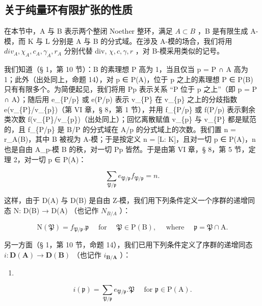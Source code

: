\subsection{关于纯量环有限扩张的性质}

在本节中，A 与 B 表示两个整闭 Noether 整环，满足 \(A \subset B\) ，B 是有限生成 A-模，而 K 与 L 分别是 A 与 B 的分式域。在涉及 A-模的场合，我们将用 \(div_{A}, \chi_{A}, c_{A}, \gamma_{A}, r_{A}\) 分别代替 div, \(\chi, c, \gamma, r\) ，对 B-模采用类似的记号。

我们知道（§ 1，第 10 节）：B 的素理想 P 高为 1，当且仅当 p = P ∩ A 高为 1；此外（出处同上，命题 14），对 p ∈ P(A)，位于 p 之上的素理想 P ∈ P(B) 只有有限多个。为简便起见，我们将用 P\textbar p 表示关系 ``P 位于 p 之上''（即 p = P ∩ A）；随后用 e\_\{P/p\} 或 e(P/p) 表示 v\_\{P\} 在 v\_\{p\} 之上的分歧指数 e(v\_\{P\}/v\_\{p\})（第 VI 章，§ 8，第 1 节），并用 f\_\{P/p\} 或 f(P/p) 表示剩余类次数 f(v\_\{P\}/v\_\{p\})（出处同上）；回忆离散赋值 v\_\{p\} 与 v\_\{P\} 都是赋范的，且 f\_\{P/p\} 是 B/P 的分式域在 A/p 的分式域上的次数。我们置 n = r\_A(B)，其中 B 被视为 A-模；于是按定义 n = {[}L: K{]}，且对一切 p ∈ P(A)，n 也是自由 A\_p-模 B 的秩，对一切 P\textbar p 皆然。于是由第 VI 章，§ 8，第 5 节，定理 2，对一切 p ∈ P(A)：

\[
\sum_ {\mathfrak {P} / \mathfrak {p}} e _ {\mathfrak {P} / \mathfrak {p}} f _ {\mathfrak {P} / \mathfrak {p}} = n.\tag{9}
\]

这样，由于 D(A) 与 D(B) 是自由 Z-模，我们用下列条件定义一个序群的递增同态 N: D(B) → D(A) （也记作 \(N_{B/A}\) ）：

\[
\mathrm{N} (\mathfrak {P}) = f _ {\mathfrak {P} / \mathfrak {p}}. \mathfrak {p} \quad \text {   for   } \quad \mathfrak {P} \in \mathrm{P} (\mathrm{B}), \quad \text {   where   } \quad \mathfrak {p} = \mathfrak {P} \cap \mathrm{A}.\tag{10}
\]

另一方面（§ 1，第 10 节，命题 14），我们已用下列条件定义了序群的递增同态 \(i\colon\mathbf{D}(\mathbf{A})\to\mathbf{D}(\mathbf{B})\) （也记作 \(i_{\mathbf{B}/\mathbf{A}}\) ）：

\begin{enumerate}
\def\labelenumi{(\arabic{enumi})}
\setcounter{enumi}{10}
\tightlist
\item
\end{enumerate}

\[
i (\mathfrak {p}) = \sum_ {\mathfrak {P} / \mathfrak {p}} e _ {\mathfrak {P} / \mathfrak {p}}. \mathfrak {P} \quad \text {   for   } \mathfrak {p} \in \mathrm{P} (\mathrm{A}).
\]

